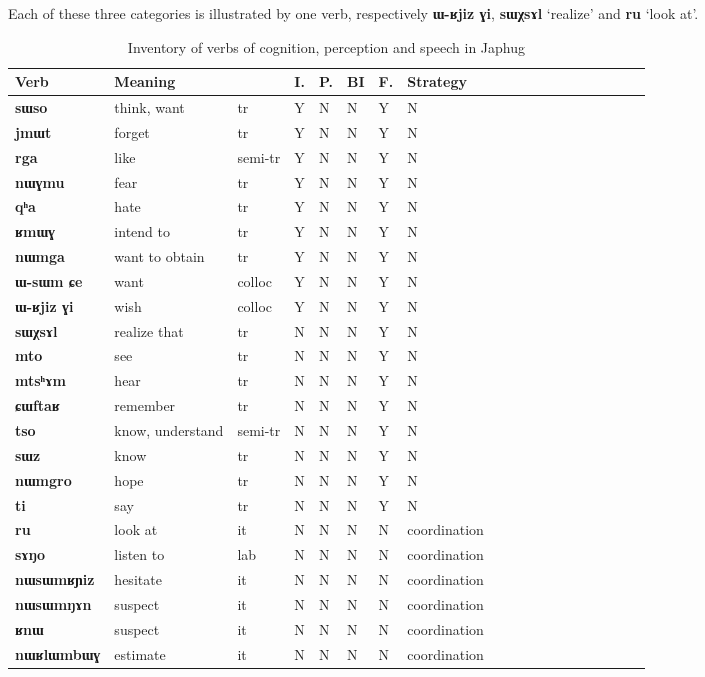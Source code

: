 \documentclass[oneside,a4paper,11pt]{article}
\newcommand{\ipa}[1]{\textbf{\phon#1}} %
\newcommand{\jpg}[2]{\ipa{#1} `#2'} %
\begin{document}
 Each of these three categories is illustrated by one verb, respectively \ipa{ɯ-ʁjiz ɣi}, \jpg{sɯχsɤl}{realize} and \jpg{ru}{look at}.
 
\begin{table}[H]
\caption{Inventory of verbs of cognition, perception and speech in Japhug} \label{tab:cognition} 
\begin{tabular}{lllllllllllllllllll}
\toprule
Verb & 	Meaning & 	 & 	I. & 	P.& 	BI & 	F. & 	Strategy & 	\\
\midrule
\ipa{sɯso} & 	think, want & 	tr  & 	Y & 	N & 	N & 	Y & 	N & 	\\
\ipa{jmɯt} & 	forget & 	tr  & 	Y & 	N & 	N & 	Y & 	N & 	\\
\ipa{rga} & 	like & 	semi-tr & 	Y & 	N & 	N & 	Y & 	N & 	\\
\ipa{nɯɣmu} & 	fear & 	tr  & 	Y & 	N & 	N & 	Y & 	N & 	\\
\ipa{qʰa} & 	hate & 	tr  & 	Y & 	N & 	N & 	Y & 	N & 	\\
\ipa{ʁmɯɣ} & 	intend to & 	tr  & 	Y & 	N & 	N & 	Y & 	N & 	\\
\ipa{nɯmga} & 	want to obtain & 	tr  & 	Y & 	N & 	N & 	Y & 	N & 	\\
\ipa{ɯ-sɯm ɕe} & 	want & 	colloc & 	Y & 	N & 	N & 	Y & 	N & 	\\
\ipa{ɯ-ʁjiz ɣi} & 	wish & 	colloc & 	Y & 	N & 	N & 	Y & 	N & 	\\
\midrule
\ipa{sɯχsɤl} & 	realize that & 	tr  & 	N & 	N & 	N & 	Y & 	N & 	\\
\ipa{mto} & 	see & 	tr  & 	N & 	N & 	N & 	Y & 	N & 	\\
\ipa{mtsʰɤm} & 	hear & 	tr  & 	N & 	N & 	N & 	Y & 	N & 	\\
\ipa{ɕɯftaʁ} & 	remember & 	tr  & 	N & 	N & 	N & 	Y & 	N & 	\\
\ipa{tso} & 	know, understand & 	semi-tr & 	N & 	N & 	N & 	Y & 	N & 	\\
\ipa{sɯz} & 	know & 	tr  & 	N & 	N & 	N & 	Y & 	N & 	\\
\ipa{nɯmgro} & 	hope & 	tr  & 	N & 	N & 	N & 	Y & 	N & 	\\
\ipa{ti} & 	say & 	tr  & 	N & 	N & 	N & 	Y & 	N & 	\\
\midrule
\ipa{ru} & 	look at & 	it & 	N & 	N & 	N & 	N & 	coordination & 	\\
\ipa{sɤŋo} & 	listen to & 	lab & 	N & 	N & 	N & 	N & 	coordination & 	\\
\ipa{nɯsɯmʁɲiz} & 	hesitate & 	it & 	N & 	N & 	N & 	N & 	coordination & 	\\
\ipa{nɯsɯmŋɤn} & 	suspect & 	it & 	N & 	N & 	N & 	N & 	coordination & 	\\
\ipa{ʁnɯ} & 	suspect & 	it & 	N & 	N & 	N & 	N & 	coordination & 	\\
\ipa{nɯʁlɯmbɯɣ} & 	estimate & 	it & 	N & 	N & 	N & 	N & 	coordination & 	\\
\bottomrule
\end{tabular}
\end{table}
\end{document}
